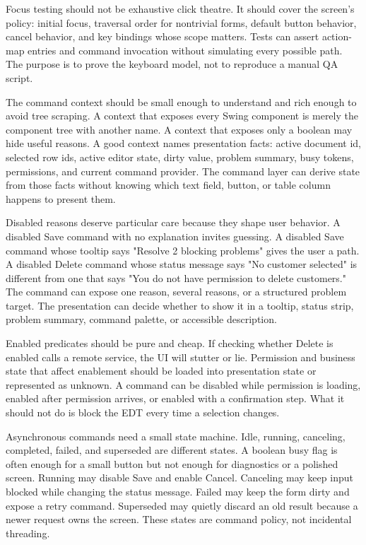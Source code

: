 Focus testing should not be exhaustive click theatre. It should cover the screen's policy: initial focus, traversal order for nontrivial forms, default button behavior, cancel behavior, and key bindings whose scope matters. Tests can assert action-map entries and command invocation without simulating every possible path. The purpose is to prove the keyboard model, not to reproduce a manual QA script.

The command context should be small enough to understand and rich enough to
avoid tree scraping. A context that exposes every Swing component is merely the
component tree with another name. A context that exposes only a boolean
 may hide useful reasons. A good context names presentation facts:
active document id, selected row ids, active editor state, dirty value,
problem summary, busy tokens, permissions, and current command provider. The
command layer can derive state from those facts without knowing which text
field, button, or table column happens to present them.

Disabled reasons deserve particular care because they shape user behavior. A
disabled Save command with no explanation invites guessing. A disabled Save
command whose tooltip says "Resolve 2 blocking problems" gives the user a path.
A disabled Delete command whose status message says "No customer selected" is
different from one that says "You do not have permission to delete customers."
The command can expose one reason, several reasons, or a structured problem
target. The presentation can decide whether to show it in a tooltip, status
strip, problem summary, command palette, or accessible description.

Enabled predicates should be pure and cheap. If checking whether Delete is
enabled calls a remote service, the UI will stutter or lie. Permission and
business state that affect enablement should be loaded into presentation state
or represented as unknown. A command can be disabled while permission is
loading, enabled after permission arrives, or enabled with a confirmation step.
What it should not do is block the EDT every time a selection changes.

Asynchronous commands need a small state machine. Idle, running, canceling,
completed, failed, and superseded are different states. A boolean busy flag is
often enough for a small button but not enough for diagnostics or a polished
screen. Running may disable Save and enable Cancel. Canceling may keep input
blocked while changing the status message. Failed may keep the form dirty and
expose a retry command. Superseded may quietly discard an old result because a
newer request owns the screen. These states are command policy, not incidental
threading.

